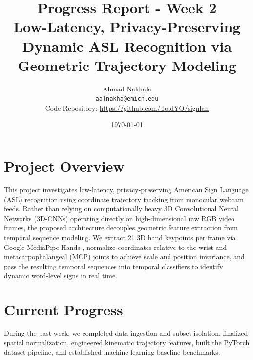 \documentclass{article}
\title{Progress Report - Week 2\\
\large Low-Latency, Privacy-Preserving Dynamic ASL Recognition via Geometric Trajectory Modeling}
\author{
  Ahmad Nakhala \\
  \texttt{aalnakha@emich.edu} \\
  \vspace{0.3em}
  \normalsize Code Repository: \url{https://github.com/ToldYO/signlan}
}
\date{\today}
\begin{document}
\maketitle

\section*{Project Overview}
This project investigates low-latency, privacy-preserving American Sign Language (ASL) recognition using coordinate trajectory tracking from monocular webcam feeds. Rather than relying on computationally heavy 3D Convolutional Neural Networks (3D-CNNs) operating directly on high-dimensional raw RGB video frames, the proposed architecture decouples geometric feature extraction from temporal sequence modeling. We extract 21 3D hand keypoints per frame via Google MediaPipe Hands \cite{lugaresi2019mediapipe, zhang2020mediapipe}, normalize coordinates relative to the wrist and metacarpophalangeal (MCP) joints to achieve scale and position invariance, and pass the resulting temporal sequences into temporal classifiers to identify dynamic word-level signs in real time.

\section*{Current Progress}
During the past week, we completed data ingestion and subset isolation, finalized spatial normalization, engineered kinematic trajectory features, built the PyTorch dataset pipeline, and established machine learning baseline benchmarks.
\end{document}
